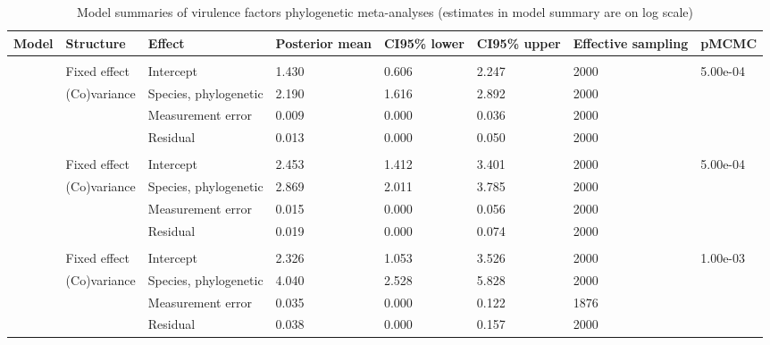 \begin{table}

\caption{\label{tab:}Model summaries of virulence factors phylogenetic meta-analyses (estimates in model summary are on log scale)}
\centering
\begin{tabular}[t]{llllllll}
\toprule
Model & Structure & Effect & Posterior
 mean & CI95\% lower & CI95\% upper & Effective
 sampling & pMCMC\\
\midrule
\addlinespace[0.3em]
\multicolumn{8}{l}{\textbf{Secretome}}\\
\hspace{1em} & Fixed effect & Intercept & 1.430 & 0.606 & 2.247 & 2000 & 5.00e-04\\
\hspace{1em} & (Co)variance & Species, phylogenetic & 2.190 & 1.616 & 2.892 & 2000 & \\
\hspace{1em} &  & Measurement error & 0.009 & 0.000 & 0.036 & 2000 & \\
\hspace{1em} &  & Residual & 0.013 & 0.000 & 0.050 & 2000 & \\
\addlinespace[0.3em]
\multicolumn{8}{l}{\textbf{Biofilm}}\\
\hspace{1em} & Fixed effect & Intercept & 2.453 & 1.412 & 3.401 & 2000 & 5.00e-04\\
\hspace{1em} & (Co)variance & Species, phylogenetic & 2.869 & 2.011 & 3.785 & 2000 & \\
\hspace{1em} &  & Measurement error & 0.015 & 0.000 & 0.056 & 2000 & \\
\hspace{1em} &  & Residual & 0.019 & 0.000 & 0.074 & 2000 & \\
\addlinespace[0.3em]
\multicolumn{8}{l}{\textbf{Siderophores}}\\
\hspace{1em} & Fixed effect & Intercept & 2.326 & 1.053 & 3.526 & 2000 & 1.00e-03\\
\hspace{1em} & (Co)variance & Species, phylogenetic & 4.040 & 2.528 & 5.828 & 2000 & \\
\hspace{1em} &  & Measurement error & 0.035 & 0.000 & 0.122 & 1876 & \\
\hspace{1em} &  & Residual & 0.038 & 0.000 & 0.157 & 2000 & \\

\end{tabular}
\end{table}
